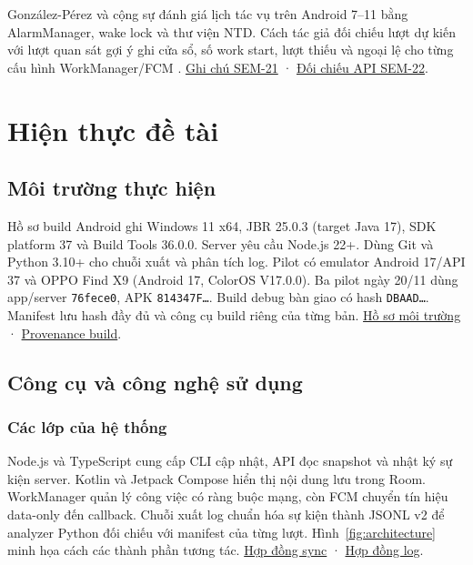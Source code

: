 \documentclass[12pt,a4paper]{report}
\newcommand{\repo}{https://github.com/ThanhTris/Seminar-IE307/blob/db8dc5f}
\newcommand{\source}[2]{\href{\repo/#1}{#2}}
\begin{document}
González-Pérez và cộng sự đánh giá lịch tác vụ trên Android 7--11 bằng AlarmManager, wake lock và thư viện NTD. Cách tác giả đối chiếu lượt dự kiến với lượt quan sát gợi ý ghi cửa sổ, số work start, lượt thiếu và ngoại lệ cho từng cấu hình WorkManager/FCM \citep{GonzalezPerez2022AndroidScheduling}. \source{research/notes/PAPER_2.md}{Ghi chú SEM-21} · \source{research/notes/API_CROSSCHECK.md}{Đối chiếu API SEM-22}.

\chapter{Hiện thực đề tài}
\section{Môi trường thực hiện}
Hồ sơ build Android ghi Windows 11 x64, JBR 25.0.3 (target Java 17), SDK platform 37 và Build Tools 36.0.0. Server yêu cầu Node.js 22+. Dùng Git và Python 3.10+ cho chuỗi xuất và phân tích log. Pilot có emulator Android 17/API 37 và OPPO Find X9 (Android 17, ColorOS V17.0.0). Ba pilot ngày 20/11 dùng app/server \texttt{76fece0}, APK \texttt{814347F\ldots}. Build debug bàn giao có hash \texttt{DBAAD\ldots}. Manifest lưu hash đầy đủ và công cụ build riêng của từng bản. \source{docs/ENVIRONMENT.md}{Hồ sơ môi trường} · \source{release/BUILD_MANIFEST.json}{Provenance build}.

\section{Công cụ và công nghệ sử dụng}
\subsection{Các lớp của hệ thống}
Node.js và TypeScript cung cấp CLI cập nhật, API đọc snapshot và nhật ký sự kiện server. Kotlin và Jetpack Compose hiển thị nội dung lưu trong Room. WorkManager quản lý công việc có ràng buộc mạng, còn FCM chuyển tín hiệu data-only đến callback. Chuỗi xuất log chuẩn hóa sự kiện thành JSONL v2 để analyzer Python đối chiếu với manifest của từng lượt. Hình~\ref{fig:architecture} minh họa cách các thành phần tương tác. \source{docs/SYNC_CORE_API.md}{Hợp đồng sync} · \source{docs/EVENT_SCHEMA.md}{Hợp đồng log}.
\end{document}
